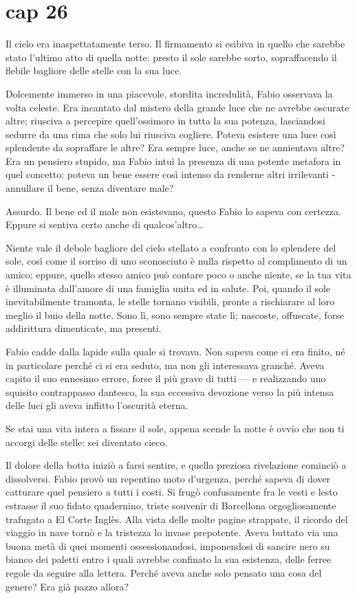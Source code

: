 \chapter{cap 26}

Il cielo era inaspettatamente terso. Il firmamento si esibiva in quello
che sarebbe stato l'ultimo atto di quella notte: presto il sole sarebbe
sorto, sopraffacendo il flebile bagliore delle stelle con la sua luce.

Dolcemente immerso in una piacevole, stordita incredulità, Fabio
osservava la volta celeste. Era incantato dal mistero della grande luce
che ne avrebbe oscurate altre; riusciva a percepire quell'ossimoro in
tutta la sua potenza, lasciandosi sedurre da una rima che solo lui
riusciva cogliere. Poteva esistere una luce così splendente da
sopraffare le altre? Era sempre luce, anche se ne annientava altre? Era
un pensiero stupido, ma Fabio intuì la presenza di una potente metafora
in quel concetto: poteva un bene essere così intenso da renderne altri
irrilevanti - annullare il bene, senza diventare male?

Assurdo. Il bene ed il male non esistevano, questo Fabio lo sapeva con
certezza. Eppure si sentiva certo anche di qualcos'altro\ldots{}

Niente vale il debole bagliore del cielo stellato a confronto con lo
splendere del sole, così come il sorriso di uno sconosciuto è nulla
rispetto al complimento di un amico; eppure, quello stesso amico può
contare poco o anche niente, se la tua vita è illuminata dall'amore di
una famiglia unita ed in salute. Poi, quando il sole inevitabilmente
tramonta, le stelle tornano visibili, pronte a rischiarare al loro
meglio il buio della notte. Sono lì, sono sempre state lì; nascoste,
offuscate, forse addirittura dimenticate, ma presenti.

Fabio cadde dalla lapide sulla quale si trovava. Non sapeva come ci era
finito, né in particolare perché ci si era seduto, ma non gli
interessava granché. Aveva capito il suo ennesimo errore, forse il più
grave di tutti --- e realizzando uno squisito contrappasso dantesco, la
sua eccessiva devozione verso la più intensa delle luci gli aveva
inflitto l'oscurità eterna.

Se stai una vita intera a fissare il sole, appena scende la notte è
ovvio che non ti accorgi delle stelle: sei diventato cieco.

Il dolore della botta iniziò a farsi sentire, e quella preziosa
rivelazione cominciò a dissolversi. Fabio provò un repentino moto
d'urgenza, perché sapeva di dover catturare quel pensiero a tutti i
costi. Si frugò confusamente fra le vesti e lesto estrasse il suo fidato
quadernino, triste souvenir di Barcellona orgogliosamente trafugato a El
Corte Inglès. Alla vista delle molte pagine strappate, il ricordo del
viaggio in nave tornò e la tristezza lo invase prepotente. Aveva buttato
via una buona metà di quei momenti ossessionandosi, imponendosi di
sancire nero su bianco dei paletti entro i quali avrebbe confinato la
sua esistenza, delle ferree regole da seguire alla lettera. Perché aveva
anche solo pensato una cosa del genere? Era già pazzo allora?


